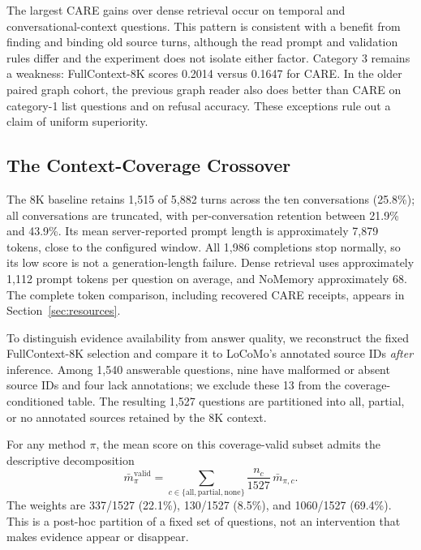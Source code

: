 \documentclass[11pt]{article}
\newcommand{\care}{\textsc{CARE}}
\begin{document}
The largest \care{} gains over dense retrieval occur on temporal and
conversational-context questions. This pattern is consistent with a benefit
from finding and binding old source turns, although the read prompt and
validation rules differ and the experiment does not isolate either factor.
Category 3 remains a weakness: FullContext-8K scores 0.2014 versus 0.1647
for \care{}. In the older paired graph cohort, the previous graph reader
also does better than \care{} on category-1 list questions and on refusal
accuracy. These exceptions rule out a claim of uniform superiority.

\subsection{The Context-Coverage Crossover}

The 8K baseline retains 1,515 of 5,882 turns across the ten conversations
(25.8\%); all conversations are truncated, with per-conversation retention
between 21.9\% and 43.9\%. Its mean server-reported prompt length is
approximately 7,879 tokens, close to the configured window. All 1,986
completions stop normally, so its low score is not a generation-length
failure. Dense retrieval uses approximately 1,112 prompt tokens per
question on average, and NoMemory approximately 68. The complete token
comparison, including recovered \care{} receipts, appears in
Section~\ref{sec:resources}.

To distinguish evidence availability from answer quality, we reconstruct
the fixed FullContext-8K selection and compare it to LoCoMo's annotated
source IDs \emph{after} inference. Among 1,540 answerable questions, nine
have malformed or absent source IDs and four lack annotations; we exclude
these 13 from the coverage-conditioned table. The resulting 1,527
questions are partitioned into all, partial, or no annotated sources
retained by the 8K context.

For any method $\pi$, the mean score on this coverage-valid subset admits
the descriptive decomposition
\begin{equation}
\bar m_{\pi}^{\mathrm{valid}}=
\sum_{c\in\{\mathrm{all},\mathrm{partial},\mathrm{none}\}}
\frac{n_c}{1527}\,\bar m_{\pi,c}.
\label{eq:coverage-decomposition}
\end{equation}
The weights are 337/1527 (22.1\%), 130/1527 (8.5\%), and 1060/1527
(69.4\%). This is a post-hoc partition of a fixed set of questions, not
an intervention that makes evidence appear or disappear.
\end{document}
